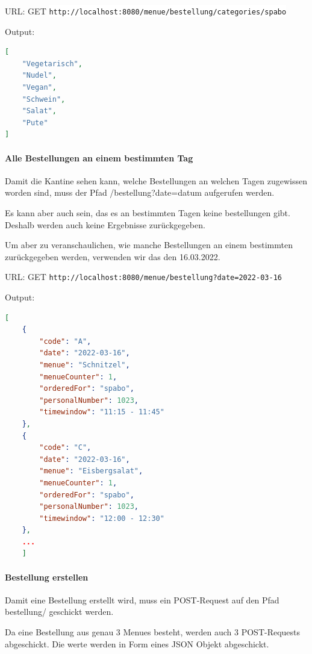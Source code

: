 URL: GET \colorbox{white}{\lstinline[basicstyle=\ttfamily\color{black},language=html]|http://localhost:8080/menue/bestellung/categories/spabo|}

Output:

\begin{lstlisting}[language=json,firstnumber=1]
[
    "Vegetarisch",
    "Nudel",
    "Vegan",
    "Schwein",
    "Salat",
    "Pute"
]
\end{lstlisting}


\paragraph{Alle Bestellungen an einem bestimmten Tag}

Damit die Kantine sehen kann, welche Bestellungen an welchen Tagen zugewissen worden sind, muss der Pfad /bestellung?date=datum aufgerufen werden.

Es kann aber auch sein, das es an bestimmten Tagen keine bestellungen gibt. Deshalb werden auch keine Ergebnisse zurückgegeben.

Um aber zu veranschaulichen, wie manche Bestellungen an einem bestimmten zurückgegeben werden, verwenden wir das den 16.03.2022.

URL: GET \colorbox{white}{\lstinline[basicstyle=\ttfamily\color{black},language=html]|http://localhost:8080/menue/bestellung?date=2022-03-16|}

Output:

\begin{lstlisting}[language=json,firstnumber=1]
[
    {
        "code": "A",
        "date": "2022-03-16",
        "menue": "Schnitzel",
        "menueCounter": 1,
        "orderedFor": "spabo",
        "personalNumber": 1023,
        "timewindow": "11:15 - 11:45"
    },
    {
        "code": "C",
        "date": "2022-03-16",
        "menue": "Eisbergsalat",
        "menueCounter": 1,
        "orderedFor": "spabo",
        "personalNumber": 1023,
        "timewindow": "12:00 - 12:30"
    },
    ...
    ]
\end{lstlisting}


\paragraph{Bestellung erstellen}

Damit eine Bestellung erstellt wird, muss ein POST-Request auf den Pfad bestellung/ geschickt werden.

Da eine Bestellung aus genau 3 Menues besteht, werden auch 3 POST-Requests abgeschickt. Die werte werden in Form eines JSON Objekt abgeschickt.

